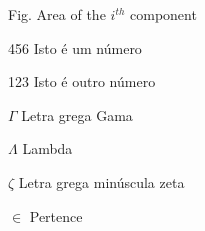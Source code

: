 \documentclass[
	12pt,				%
	oneside,          %
	a4paper,			%
	chapter=TITLE,		%
	section=TITLE,		%
	subsection=TITLE,	%
	english,			%
	brazil,				%
	]{abntUnoesc}
\begin{document}
\frenchspacing 


\imprimircapa

\imprimirfolhaderosto











\listoffigures*
\cleardoublepage


\listoftables*
\cleardoublepage  %

\begin{siglas}
  \item[Fig.] Area of the $i^{th}$ component
  \item[456] Isto é um número
  \item[123] Isto é outro número
\end{siglas}

\begin{simbolos}
  \item[$ \Gamma $] Letra grega Gama
  \item[$ \Lambda $] Lambda
  \item[$ \zeta $] Letra grega minúscula zeta
  \item[$ \in $] Pertence
\end{simbolos}

\tableofcontents*
\cleardoublepage

\textual



\end{document}
